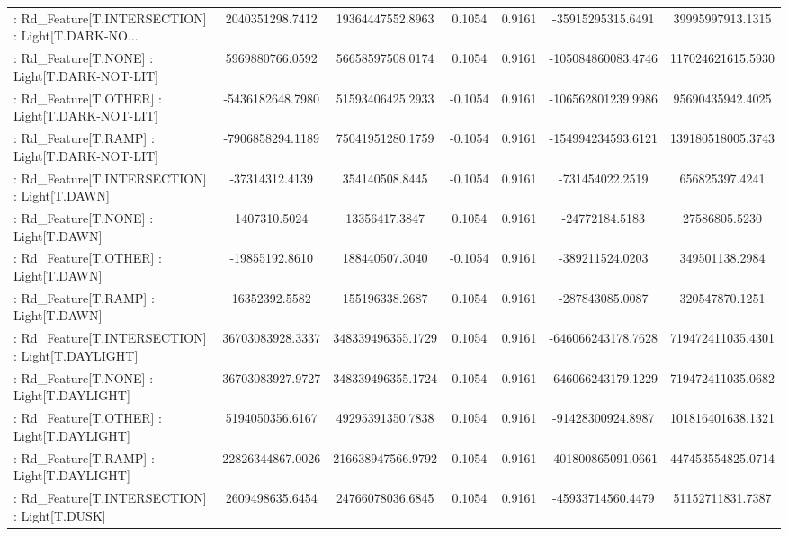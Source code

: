 \begin{longtable}{p{4cm}cccccc}
 : Rd\_Feature[T.INTERSECTION] : Light[T.DARK-NO... &   2040351298.7412 &  19364447552.8963 &  0.1054 &       0.9161 &  -35915295315.6491 &  39995997913.1315 \\
 : Rd\_Feature[T.NONE] : Light[T.DARK-NOT-LIT]      &   5969880766.0592 &  56658597508.0174 &  0.1054 &       0.9161 & -105084860083.4746 & 117024621615.5930 \\
 : Rd\_Feature[T.OTHER] : Light[T.DARK-NOT-LIT]     &  -5436182648.7980 &  51593406425.2933 & -0.1054 &       0.9161 & -106562801239.9986 &  95690435942.4025 \\
 : Rd\_Feature[T.RAMP] : Light[T.DARK-NOT-LIT]      &  -7906858294.1189 &  75041951280.1759 & -0.1054 &       0.9161 & -154994234593.6121 & 139180518005.3743 \\
 : Rd\_Feature[T.INTERSECTION] : Light[T.DAWN]      &    -37314312.4139 &    354140508.8445 & -0.1054 &       0.9161 &    -731454022.2519 &    656825397.4241 \\
 : Rd\_Feature[T.NONE] : Light[T.DAWN]              &      1407310.5024 &     13356417.3847 &  0.1054 &       0.9161 &     -24772184.5183 &     27586805.5230 \\
 : Rd\_Feature[T.OTHER] : Light[T.DAWN]             &    -19855192.8610 &    188440507.3040 & -0.1054 &       0.9161 &    -389211524.0203 &    349501138.2984 \\
 : Rd\_Feature[T.RAMP] : Light[T.DAWN]              &     16352392.5582 &    155196338.2687 &  0.1054 &       0.9161 &    -287843085.0087 &    320547870.1251 \\
 : Rd\_Feature[T.INTERSECTION] : Light[T.DAYLIGHT]  &  36703083928.3337 & 348339496355.1729 &  0.1054 &       0.9161 & -646066243178.7628 & 719472411035.4301 \\
 : Rd\_Feature[T.NONE] : Light[T.DAYLIGHT]          &  36703083927.9727 & 348339496355.1724 &  0.1054 &       0.9161 & -646066243179.1229 & 719472411035.0682 \\
 : Rd\_Feature[T.OTHER] : Light[T.DAYLIGHT]         &   5194050356.6167 &  49295391350.7838 &  0.1054 &       0.9161 &  -91428300924.8987 & 101816401638.1321 \\
 : Rd\_Feature[T.RAMP] : Light[T.DAYLIGHT]          &  22826344867.0026 & 216638947566.9792 &  0.1054 &       0.9161 & -401800865091.0661 & 447453554825.0714 \\
 : Rd\_Feature[T.INTERSECTION] : Light[T.DUSK]      &   2609498635.6454 &  24766078036.6845 &  0.1054 &       0.9161 &  -45933714560.4479 &  51152711831.7387 \\

\end{longtable}
